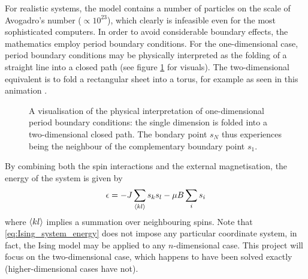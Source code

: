 \documentclass[nofootinbib,reprint,english]{revtex4-1}
\begin{document}
For realistic systems, the model contains a number of particles on the scale of Avogadro's number (\(\propto10^{23}\)), which clearly is infeasible even for the most sophisticated computers. In order to avoid considerable boundary effects, the mathematics employ period boundary conditions. For the one-dimensional case, period boundary conditions may be physically interpreted as the folding of a straight line into a closed path (see figure \ref{fig:one_dimensional_boundary_conditions} for visuals). The two-dimensional equivalent is to fold a rectangular sheet into a torus, for example as seen in this animation \cite{animation}.

\begin{figure}
\centering
{}
\caption{A visualisation of the physical interpretation of one-dimensional period boundary conditions: the single dimension is folded into a two-dimensional closed path. The bondary point \(s_N\) thus experiences being the neighbour of the complementary boundary point \(s_1\).}\label{fig:one_dimensional_boundary_conditions}
\end{figure}

By combining both the spin interactions and the external magnetisation, the energy of the system is given by
\begin{equation}\label{eq:Ising_system_energy}
\epsilon=-J\sum_{\expval{kl}}s_ks_l-\mu B\sum_is_i
\end{equation}
where \(\expval{kl}\) implies a summation over neighbouring spins. Note that \eqref{eq:Ising_system_energy} does not impose any particular coordinate system, in fact, the Ising model may be applied to any \(n\)-dimensional case. This project will focus on the two-dimensional case, which happens to have been solved exactly (higher-dimensional cases have not). 
\end{document}
